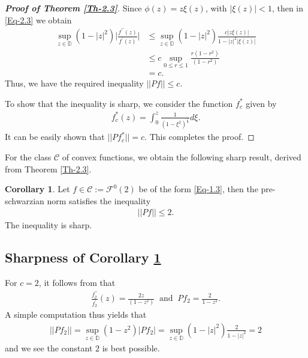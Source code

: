 \documentclass[a4paper,12pt]{amsart}
\theoremstyle{plain}
\theoremstyle{definition}
\newtheorem{cor}{Corollary}[section]
\theoremstyle{plain}
\newcounter {own}
\begin{document}
\begin{proof}[\bf Proof of Theorem \ref{Th-2.3}]
	Since $\phi(z)=z\xi(z)$, with $|\xi(z)|<1$, then in \eqref{Eq-2.3} we obtain
	\begin{align*}
		\sup_{z\in\mathbb{D}}(1-|z|^2)\bigg|\frac{f^{\prime\prime}(z)}{f^{\prime}(z)}\bigg|&\leq\sup_{z\in\mathbb{D}}(1-|z|^2)\frac{c|z\xi(z)|}{1-|z|^2|\xi(z)|}\\&\leq c \sup_{0\leq r\leq 1}\frac{r(1-r^2)}{(1-r^2)}\\&=c.
	\end{align*}
	Thus, we have the required inequality $||Pf||\leq c$. \vspace{2mm}
	
	To show that the inequality is sharp, we consider the function $f_{c}^*$ given by
	\begin{align*}
		f_{c}^*(z)=	\int_{0}^{z}\frac{1}{(1-\xi^2)^\frac{c}{2}} d\xi.
	\end{align*}
	It can be easily shown that $||Pf_c^*||=c.$ This completes the proof.
\end{proof}
For the class $\mathcal{C}$ of convex functions, we obtain the following sharp result, derived from Theorem \ref{Th-2.3}.
\begin{cor}\label{Cor-2.4}
	Let $f\in\mathcal{C}:=\mathcal{F}^0(2)$ be of the form \eqref{Eq-1.3}, then the pre-schwarzian norm satisfies the inequality
	\begin{align*}
		||Pf||\leq 2.
	\end{align*}
	The inequality is sharp.
\end{cor}
\subsection*{Sharpness of Corollary \ref{Cor-2.4}}
For $c=2$, it follows from  that
\begin{align*}
	\frac{f_{2}^{\prime\prime}}{f_{2}^{\prime}}(z)=\frac{2z}{(1-z^2)}\;\;\mbox{and}\;\;Pf_2=\frac{2}{1-z^2}.
\end{align*}
A simple computation thus yields that
\begin{align*}
	||Pf_2||=\sup_{z\in\mathbb{D}}\left(1-z^2\right)|Pf_2|=\sup_{z\in\mathbb{D}}\left(1-|z|^2\right)\frac{2}{1-|z|^2}=2
\end{align*}
and we see the constant $2$ is best possible.\vspace{2mm}
\end{document}
